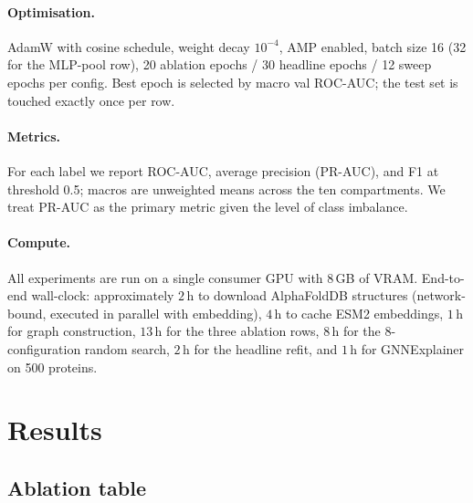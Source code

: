\documentclass{article}
\begin{document}
\paragraph{Optimisation.}
AdamW with cosine schedule, weight decay $10^{-4}$, AMP enabled, batch
size 16 (32 for the MLP-pool row), 20 ablation epochs / 30 headline
epochs / 12 sweep epochs per config. Best epoch is selected by macro
val ROC-AUC; the test set is touched exactly once per row.

\paragraph{Metrics.}
For each label we report ROC-AUC, average precision (PR-AUC), and F1 at
threshold 0.5; macros are unweighted means across the ten compartments.
We treat PR-AUC as the primary metric given the level of class imbalance.

\paragraph{Compute.}
All experiments are run on a single consumer GPU with 8\,GB of VRAM.
End-to-end wall-clock: approximately $2$\,h to download AlphaFoldDB
structures (network-bound, executed in parallel with embedding),
$4$\,h to cache ESM2 embeddings, $1$\,h for graph construction,
$13$\,h for the three ablation rows, $8$\,h for the 8-configuration
random search, $2$\,h for the headline refit, and $1$\,h for
GNNExplainer on 500 proteins.

\section{Results}\label{sec:results}

\subsection{Ablation table}
\end{document}
